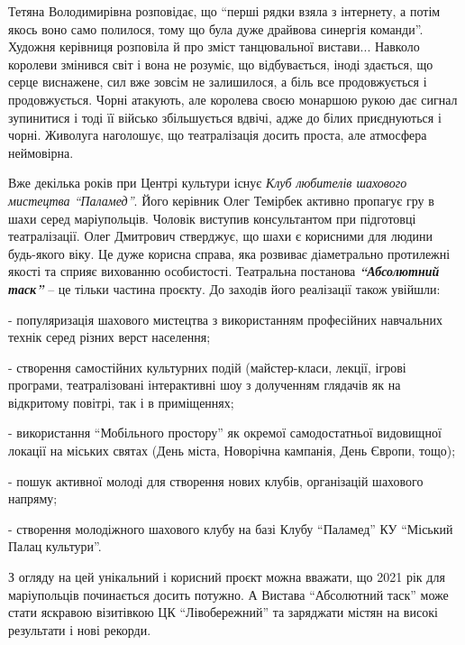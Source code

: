 
Тетяна Володимирівна розповідає, що \enquote{перші рядки взяла з інтернету, а потім
якось воно само полилося, тому що була дуже драйвова синергія команди}. Художня
керівниця розповіла й про зміст танцювальної вистави... Навколо королеви
змінився світ і вона не розуміє, що відбувається, іноді здається, що серце
виснажене, сил вже зовсім не залишилося, а біль все продовжується і
продовжується. Чорні атакують, але королева своєю монаршою рукою дає сигнал
зупинитися і тоді її військо збільшується вдвічі, адже до білих приєднуються і
чорні. Живолуга наголошує, що театралізація досить проста, але атмосфера
неймовірна.

Вже декілька років при Центрі культури існує \emph{Клуб любителів шахового мистецтва
\enquote{Паламед}}. Його керівник Олег Темірбек активно пропагує гру в шахи серед
маріупольців. Чоловік виступив консультантом при підготовці театралізації. Олег
Дмитрович стверджує, що шахи є корисними для людини будь-якого віку. Це дуже
корисна справа, яка розвиває діаметрально протилежні якості та сприяє вихованню
особистості. Театральна постанова \emph{\textbf{\enquote{Абсолютний таск}}} – це тільки частина
проєкту. До заходів його реалізації також увійшли:


- популяризація шахового мистецтва з використанням професійних навчальних
технік серед різних верст населення;

- створення самостійних культурних подій (майстер-класи, лекції, ігрові
програми, театралізовані інтерактивні шоу з долученням глядачів як на
відкритому повітрі, так і в приміщеннях;

- використання \enquote{Мобільного простору} як окремої самодостатньої видовищної
локації на міських святах (День міста, Новорічна кампанія, День Європи, тощо);

- пошук активної молоді для створення нових клубів, організацій  шахового
напряму;

- створення молодіжного шахового клубу на базі Клубу \enquote{Паламед} КУ \enquote{Міський
Палац культури}.

З огляду на цей унікальний і корисний проєкт можна вважати, що 2021 рік для
маріупольців починається досить потужно. А Вистава \enquote{Абсолютний таск} може стати
яскравою візитівкою ЦК \enquote{Лівобережний} та заряджати містян на високі результати
і нові рекорди.

